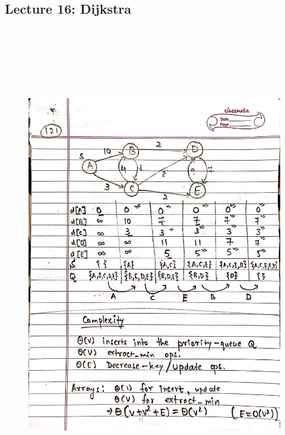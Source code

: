 \newpage
{\color{black} \subsection*{Lecture 16: Dijkstra}}
\begin{figure}[H]
    \centering
    \includegraphics[width=16cm, height=21cm]{"./MIT-6.006/MIT-6006-121"}
\end{figure}

